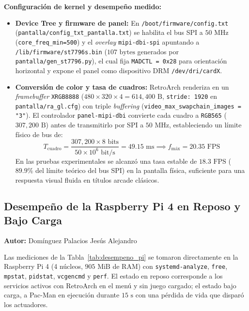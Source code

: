 \textbf{Configuración de kernel y desempeño medido:}
\begin{itemize}
	\item \textbf{Device Tree y firmware de panel:} En \texttt{/boot/firmware/config.txt} (\texttt{pantalla/config\_txt\_pantalla.txt}) se habilita el bus SPI a $50\text{ MHz}$ (\texttt{core\_freq\_min=500}) y el \textit{overlay} \texttt{mipi-dbi-spi} apuntando a \texttt{/lib/firmware/st7796s.bin} ($107\text{ bytes}$ generados por \texttt{pantalla/gen\_st7796.py}), el cual fija \texttt{MADCTL = 0x28} para orientación horizontal y expone el panel como dispositivo DRM \texttt{/dev/dri/cardX}.
	\item \textbf{Conversión de color y tasa de cuadros:} RetroArch renderiza en un \textit{framebuffer} \texttt{XRGB8888} ($480 \times 320 \times 4 = 614{,}400\text{ B}$, \texttt{stride: 1920} en \texttt{pantalla/ra\_gl.cfg}) con triple \textit{buffering} (\texttt{video\_max\_swapchain\_images = "3"}). El controlador \texttt{panel-mipi-dbi} convierte cada cuadro a \texttt{RGB565} ($307{,}200\text{ B}$) antes de transmitirlo por SPI a $50\text{ MHz}$, estableciendo un límite físico de bus de:
	\[
	T_{\text{cuadro}} = \frac{307{,}200 \times 8\text{ bits}}{50 \times 10^6\text{ bit/s}} = 49.15\text{ ms} \implies f_{\text{máx}} = 20.35\text{ FPS}
	\]
	En las pruebas experimentales se alcanzó una tasa estable de \textbf{$18.3\text{ FPS}$} ($89.9\%$ del límite teórico del bus SPI) en la pantalla física, suficiente para una respuesta visual fluida en títulos arcade clásicos.
\end{itemize}

\subsection{Desempeño de la Raspberry Pi 4 en Reposo y Bajo Carga}
\textbf{Autor:} Domínguez Palacios Jesús Alejandro

Las mediciones de la Tabla~\ref{tab:desempeno_pi} se tomaron directamente en la Raspberry Pi 4 (4 núcleos, $905\text{ MiB}$ de RAM) con \texttt{systemd-analyze}, \texttt{free}, \texttt{mpstat}, \texttt{pidstat}, \texttt{vcgencmd} y \texttt{perf}. El estado en reposo corresponde a los servicios activos con RetroArch en el menú y sin juego cargado; el estado bajo carga, a Pac-Man en ejecución durante $15\text{ s}$ con una pérdida de vida que disparó los actuadores.


